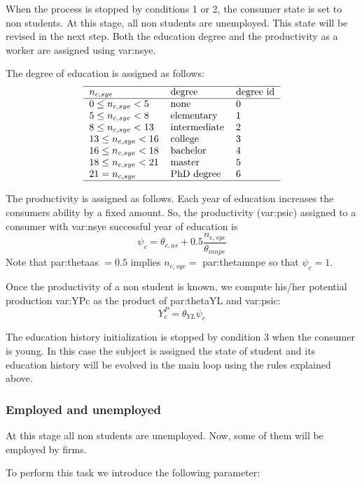 \documentclass{book}
\begin{document}
When the process is stopped by conditions 1 or 2, the consumer state is set to non students. At this stage, all non students are unemployed. This state will be revised in the next step. Both the education degree and the productivity as a worker are assigned using \gls{var:nsye}. 

The degree of education is assigned as follows:
\[
	\begin{tabular}{l l l}
	\hline
	$n_{c,sye}$& \textnormal{degree}& \textnormal{degree id}\\
	\hline
	$0\le n_{c,sye}<5$ & \textnormal{none}&0\\
	$5\le n_{c,sye}<8$ & \textnormal{elementary}&1\\
	$8\le n_{c,sye}<13$ & \textnormal{intermediate}&2\\
	$13\le n_{c,sye}<16$ & \textnormal{college}&3\\
	$16\le n_{c,sye}<18$ & \textnormal{bachelor}&4\\
	$18\le n_{c,sye}<21$ & \textnormal{master}&5\\
	$21= n_{c,sye}$ & \textnormal{PhD degree}&6\\
	\hline
	\end{tabular}
\]

The productivity is assigned as follows. Each year of education increases the consumers ability by a fixed amount. So, the productivity (\gls{var:psic}) assigned to a consumer  with \gls{var:nsye} successful year of education is
\[
	\psi_c=\theta_{c,as}+0.5\frac{n_{c,sye}}{\theta_{mnpe}}
\]
Note that \gls{par:thetaas} $=0.5$ implies $n_{c,sye}=$ \gls{par:thetamnpe} so that $\psi_c=1$.

Once the productivity of a non student is known, we compute his/her potential production \gls{var:YPc} as the product of \gls{par:thetaYL} and \gls{var:psic}: 
\[Y^{P}_c=\theta_{YL}\psi_c\]

The education history initialization is stopped by condition 3 when the consumer is young. In this case the subject is assigned the state of student and its education history will be evolved in the main loop using the rules explained above.

\subsubsection*{Employed and unemployed}

At this stage all non students are unemployed. Now, some of them will be employed by firms. 

To perform this task we introduce the following parameter:
\end{document}

